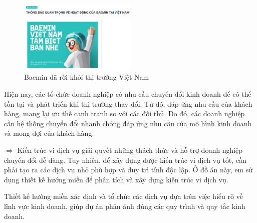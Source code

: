 \begin{figure}[H]

\centering

\includegraphics[width = 0.5\textwidth]{pictures/Baemin/main.png}

\caption{Baemin đã rời khỏi thị trường Việt Nam}

\end{figure}


Hiện nay, các tổ chức doanh nghiệp có nhu cầu chuyển đổi kinh doanh để có thể tồn tại và phát triển khi thị trường thay đổi. Từ đó, đáp ứng nhu cầu của khách hàng, mang lại ưu thế cạnh tranh so với các đối thủ. Do đó,  các     doanh nghiệp cần hệ thống chuyển đổi nhanh chóng đáp ứng nhu cầu của     mô hình kinh doanh       và mong đợi của khách hàng.

$\Rightarrow$ Kiến trúc vi dịch vụ giải quyết những thách thức và hỗ trợ doanh nghiệp chuyển đổi dễ dàng.        Tuy nhiên, để xây dựng được kiến trúc vi dịch vụ tốt, cần phải tạo ra các dịch vụ nhỏ phù hợp và duy trì tính độc lập.      Ở đồ án này, em sử dụng thiết kế hướng miền để phân tích và xây dựng kiến trúc vi dịch vụ.  

Thiết kế hướng miền xác định và tổ chức các dịch vụ dựa trên việc hiểu rõ về lĩnh vực kinh doanh, giúp dự án phản ánh đúng các quy trình và quy tắc kinh doanh.





